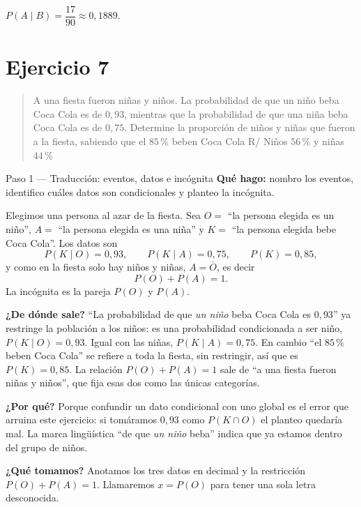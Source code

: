 \documentclass[11pt]{article}
\begin{document}
\begin{resp}
$P(A\mid B)=\dfrac{17}{90}\approx 0{,}1889$.
\end{resp}

\section*{Ejercicio 7}

\begin{quote}
A una fiesta fueron niñas y niños. La probabilidad de que un niño beba Coca Cola es de $0{,}93$, mientras que la probabilidad de que una niña beba Coca Cola es de $0{,}75$. Determine la proporción de niños y niñas que fueron a la fiesta, sabiendo que el $85\,\%$ beben Coca Cola \hfill R/ Niños $56\,\%$ y niñas $44\,\%$
\end{quote}

\begin{paso}{Paso 1 --- Traducción: eventos, datos e incógnita}
\textbf{Qué hago:} nombro los eventos, identifico cuáles datos son condicionales y planteo la incógnita.

Elegimos una persona al azar de la fiesta. Sea $O=$ ``la persona elegida es un niño'', $A=$ ``la persona elegida es una niña'' y $K=$ ``la persona elegida bebe Coca Cola''. Los datos son
\[
P(K\mid O)=0{,}93,\qquad P(K\mid A)=0{,}75,\qquad P(K)=0{,}85,
\]
y como en la fiesta solo hay niños y niñas, $A=\overline{O}$, es decir
\[
P(O)+P(A)=1.
\]
La incógnita es la pareja $P(O)$ y $P(A)$.

\textbf{¿De dónde sale?} ``La probabilidad de que \emph{un niño} beba Coca Cola es $0{,}93$'' ya restringe la población a los niños: es una probabilidad condicionada a ser niño, $P(K\mid O)=0{,}93$. Igual con las niñas, $P(K\mid A)=0{,}75$. En cambio ``el $85\,\%$ beben Coca Cola'' se refiere a toda la fiesta, sin restringir, así que es $P(K)=0{,}85$. La relación $P(O)+P(A)=1$ sale de ``a una fiesta fueron niñas y niños'', que fija esas dos como las únicas categorías.

\textbf{¿Por qué?} Porque confundir un dato condicional con uno global es el error que arruina este ejercicio: si tomáramos $0{,}93$ como $P(K\cap O)$ el planteo quedaría mal. La marca lingüística ``de que \emph{un niño} beba'' indica que ya estamos dentro del grupo de niños.

\textbf{¿Qué tomamos?} Anotamos los tres datos en decimal y la restricción $P(O)+P(A)=1$. Llamaremos $x=P(O)$ para tener una sola letra desconocida.
\end{paso}
\end{document}

